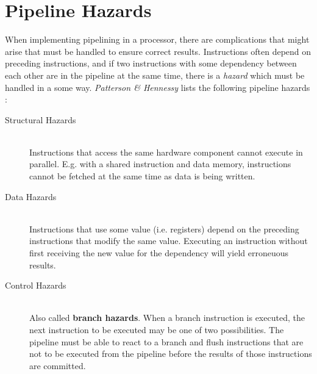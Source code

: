 \section{Pipeline Hazards}
When implementing pipelining in a processor,
there are complications that might arise that must be handled to ensure correct results.
Instructions often depend on preceding instructions,
and if two instructions with some dependency between each other are in the pipeline at the same time,
there is a \textit{hazard} which must be handled in a some way.
\textit{Patterson \& Hennessy} lists the following pipeline hazards
\cite[Chapter 4.5]{bib:patt-henn}:

\begin{description}
\item[Structural Hazards] \hfill \\
    Instructions that access the same hardware component cannot execute in parallel.
    E.g. with a shared instruction and data memory,
    instructions cannot be fetched at the same time as data is being written.
\item[Data Hazards] \hfill \\
    Instructions that use some value (i.e. registers) depend on the preceding instructions that modify the same value.
    Executing an instruction without first receiving the new value for the dependency will yield erroneuous results.
\item[Control Hazards] \hfill \\
    Also called \textbf{branch hazards}.
    When a branch instruction is executed,
    the next instruction to be executed may be one of two possibilities.
    The pipeline must be able to react to a branch and flush instructions that are not to be executed from the pipeline before the results of those instructions are committed.
\end{description}

